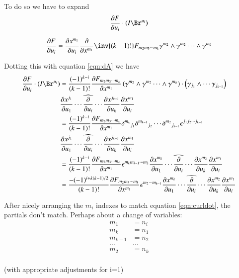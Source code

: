 \documentclass{article}
\newcommand{\PD}[2]{\frac{\partial {#2}}{\partial {#1}}}
\begin{document}
To do so we have to expand
\begin{equation*}
\PD{u_i}{F} \cdot (I \Br^{u_i})
\end{equation*}

\begin{align*}
\PD{u_i}{F}
&=
\PD{u_i}{x^{m_1}}
\PD{x^{m_1}}{}
\inv{(k-1)!} F_{m_2 m_3 \cdots m_{k}} \gamma^{m_2} \wedge \gamma^{m_2} \cdots \wedge \gamma^{m_{k}} \\
\end{align*}

Dotting this with equation \ref{eqn:dA} we have
\begin{align*}
\PD{u_i}{F} \cdot (I \Br^{u_i})
&=
\frac{(-1)^{k-i}}{(k-1)!}
\PD{x^{m_1}}{F_{m_2 m_3 \cdots m_{k}}}
\left( \gamma^{m_2} \wedge \gamma^{m_2} \cdots \wedge \gamma^{m_{k}} \right) \cdot
\left( \gamma_{j_1} \wedge \cdots \gamma_{j_{k-1}} \right) \\
&\PD{u_1}{x^{j_1}} \cdots \widehat{\PD{u_i}{}} \cdots \PD{u_k}{x^{j_{k-1}}} \PD{u_i}{x^{m_1}} \\
&=
\frac{(-1)^{k-i}}{(k-1)!}
\PD{x^{m_1}}{F_{m_2 m_3 \cdots m_{k}}}
{\delta^{m_k}}_{j_1}
{\delta^{m_{k-1}}}_{j_2}
\cdots
{\delta^{m_{2}}}_{j_{k-1}}
\epsilon^{j_1 j_2 \cdots j_{k-1}} \\
&\PD{u_1}{x^{j_1}} \cdots \widehat{\PD{u_i}{}} \cdots \PD{u_k}{x^{j_{k-1}}} \PD{u_i}{x^{m_1}} \\
&=
\frac{(-1)^{k-i}}{(k-1)!}
\PD{x^{m_1}}{F_{m_2 m_3 \cdots m_{k}}}
\epsilon^{m_k m_{k-1} \cdots m_{2}} 
\PD{u_1}{x^{m_k}} \cdots \widehat{\PD{u_i}{}} \cdots \PD{u_k}{x^{m_{2}}} \PD{u_i}{x^{m_1}} \\
&=
\frac{-(-1)^{i + k(k-1)/2}}{(k-1)!}
\PD{x^{m_1}}{F_{m_2 m_3 \cdots m_{k}}}
\epsilon^{m_2 \cdots m_{k-1}} 
\PD{u_1}{x^{m_k}} \cdots \widehat{\PD{u_i}{}} \cdots \PD{u_k}{x^{m_{2}}} \PD{u_i}{x^{m_1}} \\
\end{align*}

After nicely arranging the $m_i$ indexes to match equation \ref{eqn:curldot}, the partials don't match.  Perhaps about a change of variables:
\begin{align*}
m_1 &= n_i \\
m_k &= n_1 \\
m_{k-1} &= n_2 \\
\hdots & \hdots \\
m_2 &= n_k \\
\end{align*}

(with appropriate adjustments for i=1)
\end{document}
